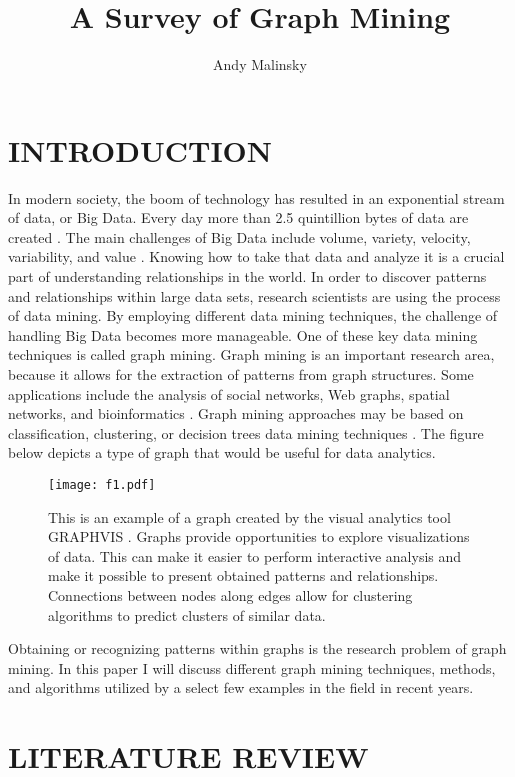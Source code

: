 \documentclass[letterpaper, 10 pt, conference]{ieeeconf}
\title{\LARGE \bf A Survey of Graph Mining}
\author{Andy Malinsky}%
\begin{document}
\maketitle
\thispagestyle{empty}
\pagestyle{empty}

\section{INTRODUCTION}
In modern society, the boom of technology has resulted in an exponential stream of data, or Big Data. Every day more than 2.5 quintillion bytes of data are created \cite{c10}. The main challenges of Big Data include volume, variety, velocity, variability, and value \cite{c9}. Knowing how to take that data and analyze it is a crucial part of understanding relationships in the world. In order to discover patterns and relationships within large data sets, research scientists are using the process of data mining. By employing different data mining techniques, the challenge of handling Big Data becomes more manageable. One of these key data mining techniques is called graph mining. Graph mining is an important research area, because it allows for the extraction of patterns from graph structures. Some applications include the analysis of social networks, Web graphs, spatial networks, and bioinformatics \cite{c1}. Graph mining approaches may be based on classification, clustering, or decision trees data mining techniques \cite{c7}. The figure below depicts a type of graph that would be useful for data analytics.

\begin{figure}[ht!] %
\centering
\hspace*{-4cm} 
\texttt{[image: f1.pdf]}
\caption{This is an example of a graph created by the visual analytics tool GRAPHVIS \cite{c11}. Graphs provide opportunities to explore visualizations of data. This can make it easier to perform interactive analysis and make it possible to present obtained patterns and relationships. Connections between nodes along edges allow for clustering algorithms to predict clusters of similar data.}
\label{graph_example}
\end{figure}

Obtaining or recognizing patterns within graphs is the research problem of graph mining. In this paper I will discuss different graph mining techniques, methods, and algorithms utilized by a select few examples in the field in recent years.

\hfill
\section{LITERATURE REVIEW}
\end{document}
